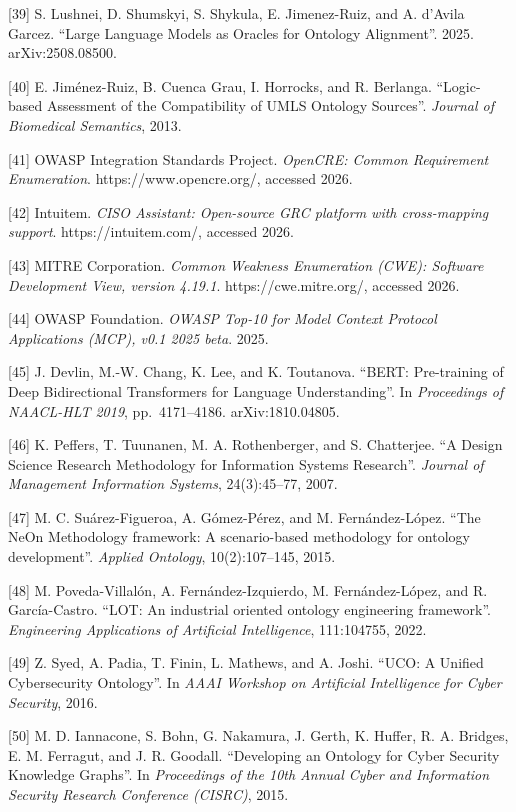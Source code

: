 \documentclass[
]{article}
\begin{document}
{[}39{]} S. Lushnei, D. Shumskyi, S. Shykula, E. Jimenez-Ruiz, and A.
d'Avila Garcez. ``Large Language Models as Oracles for Ontology
Alignment''. 2025. arXiv:2508.08500.

{[}40{]} E. Jiménez-Ruiz, B. Cuenca Grau, I. Horrocks, and R. Berlanga.
``Logic-based Assessment of the Compatibility of UMLS Ontology
Sources''. \emph{Journal of Biomedical Semantics}, 2013.

{[}41{]} OWASP Integration Standards Project. \emph{OpenCRE: Common
Requirement Enumeration}. https://www.opencre.org/, accessed 2026.

{[}42{]} Intuitem. \emph{CISO Assistant: Open-source GRC platform with
cross-mapping support}. https://intuitem.com/, accessed 2026.

{[}43{]} MITRE Corporation. \emph{Common Weakness Enumeration (CWE):
Software Development View, version 4.19.1}. https://cwe.mitre.org/,
accessed 2026.

{[}44{]} OWASP Foundation. \emph{OWASP Top-10 for Model Context Protocol
Applications (MCP), v0.1 2025 beta}. 2025.

{[}45{]} J. Devlin, M.-W. Chang, K. Lee, and K. Toutanova. ``BERT:
Pre-training of Deep Bidirectional Transformers for Language
Understanding''. In \emph{Proceedings of NAACL-HLT 2019},
pp.~4171--4186. arXiv:1810.04805.

{[}46{]} K. Peffers, T. Tuunanen, M. A. Rothenberger, and S. Chatterjee.
``A Design Science Research Methodology for Information Systems
Research''. \emph{Journal of Management Information Systems},
24(3):45--77, 2007.

{[}47{]} M. C. Suárez-Figueroa, A. Gómez-Pérez, and M. Fernández-López.
``The NeOn Methodology framework: A scenario-based methodology for
ontology development''. \emph{Applied Ontology}, 10(2):107--145, 2015.

{[}48{]} M. Poveda-Villalón, A. Fernández-Izquierdo, M. Fernández-López,
and R. García-Castro. ``LOT: An industrial oriented ontology engineering
framework''. \emph{Engineering Applications of Artificial Intelligence},
111:104755, 2022.

{[}49{]} Z. Syed, A. Padia, T. Finin, L. Mathews, and A. Joshi. ``UCO: A
Unified Cybersecurity Ontology''. In \emph{AAAI Workshop on Artificial
Intelligence for Cyber Security}, 2016.

{[}50{]} M. D. Iannacone, S. Bohn, G. Nakamura, J. Gerth, K. Huffer, R.
A. Bridges, E. M. Ferragut, and J. R. Goodall. ``Developing an Ontology
for Cyber Security Knowledge Graphs''. In \emph{Proceedings of the 10th
Annual Cyber and Information Security Research Conference (CISRC)},
2015.
\end{document}
